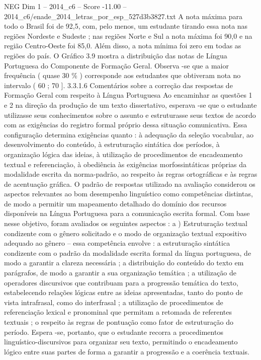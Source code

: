 \begin{textsample}{NEG Dim 1 – 2014\_c6 – Score -11.00 – 2014\_c6/enade\_2014\_letras\_por\_esp\_527d3b3827.txt}
A nota máxima para todo o Brasil foi de 92,5, com, pelo menos, um estudante tirando essa nota nas regiões Nordeste e Sudeste ; nas regiões Norte e Sul a nota máxima foi 90,0 e na região Centro-Oeste foi 85,0.
Além disso, a nota mínima foi zero em todas as regiões do país.
O Gráfico 3.9 mostra a distribuição das notas de Língua Portuguesa do Componente de Formação Geral.
Observa -se que a maior frequência ( quase 30 \% ) corresponde aos estudantes que obtiveram nota no intervalo ( 60 ; 70 ]. 3.3.1.6 Comentários sobre a correção das respostas de Formação Geral com respeito à Língua Portuguesa Ao encaminhar as questões 1 e 2 na direção da produção de um texto dissertativo, esperava -se que o estudante utilizasse seus conhecimentos sobre o assunto e estruturasse seus textos de acordo com as exigências do registro formal próprio dessa situação comunicativa.
Essa configuração determina exigências quanto : à adequação da seleção vocabular, ao desenvolvimento do conteúdo, à estruturação sintática dos períodos, à organização lógica das ideias, à utilização de procedimentos de encadeamento textual e referenciação, à obediência às exigências morfossintáticas próprias da modalidade escrita da norma-padrão, ao respeito às regras ortográficas e às regras de acentuação gráfica.
O padrão de respostas utilizado na avaliação considerou os aspectos relevantes ao bom desempenho linguístico como competências distintas, de modo a permitir um mapeamento detalhado do domínio dos recursos disponíveis na Língua Portuguesa para a comunicação escrita formal.
Com base nesse objetivo, foram avaliados os seguintes aspectos : a ) Estruturação textual condizente com o gênero solicitado e o modo de organização textual expositivo adequado ao gênero – essa competência envolve : a estruturação sintática condizente com o padrão da modalidade escrita formal da língua portuguesa, de modo a garantir a clareza necessária ; a distribuição do conteúdo do texto em parágrafos, de modo a garantir a sua organização temática ; a utilização de operadores discursivos que contribuam para a progressão temática do texto, estabelecendo relações lógicas entre as ideias apresentadas, tanto do ponto de vista intrafrasal, como do interfrasal ; a utilização de procedimentos de referenciação lexical e pronominal que permitam a retomada de referentes textuais ; o respeito às regras de pontuação como fator de estruturação do período.
Espera -se, portanto, que o estudante recorra a procedimentos linguístico-discursivos para organizar seu texto, permitindo o encadeamento lógico entre suas partes de forma a garantir a progressão e a coerência textuais.

\end{textsample}
